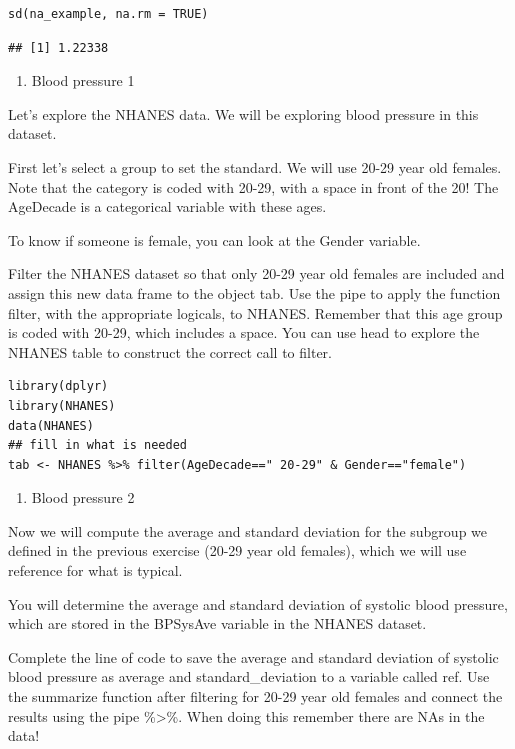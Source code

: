 \documentclass[
]{article}
\providecommand{\tightlist}{%
  \setlength{\itemsep}{0pt}\setlength{\parskip}{0pt}}
\begin{document}
\begin{verbatim}
sd(na_example, na.rm = TRUE)
\end{verbatim}

\begin{verbatim}
## [1] 1.22338
\end{verbatim}

\begin{enumerate}
\def\labelenumi{\arabic{enumi}.}
\tightlist
\item
  Blood pressure 1
\end{enumerate}

Let's explore the NHANES data. We will be exploring blood pressure in
this dataset.

First let's select a group to set the standard. We will use 20-29 year
old females. Note that the category is coded with 20-29, with a space in
front of the 20! The AgeDecade is a categorical variable with these
ages.

To know if someone is female, you can look at the Gender variable.

Filter the NHANES dataset so that only 20-29 year old females are
included and assign this new data frame to the object tab. Use the pipe
to apply the function filter, with the appropriate logicals, to NHANES.
Remember that this age group is coded with 20-29, which includes a
space. You can use head to explore the NHANES table to construct the
correct call to filter.

\begin{verbatim}
library(dplyr)
library(NHANES)
data(NHANES)
## fill in what is needed
tab <- NHANES %>% filter(AgeDecade==" 20-29" & Gender=="female")
\end{verbatim}

\begin{enumerate}
\def\labelenumi{\arabic{enumi}.}
\setcounter{enumi}{1}
\tightlist
\item
  Blood pressure 2
\end{enumerate}

Now we will compute the average and standard deviation for the subgroup
we defined in the previous exercise (20-29 year old females), which we
will use reference for what is typical.

You will determine the average and standard deviation of systolic blood
pressure, which are stored in the BPSysAve variable in the NHANES
dataset.

Complete the line of code to save the average and standard deviation of
systolic blood pressure as average and standard\_deviation to a variable
called ref. Use the summarize function after filtering for 20-29 year
old females and connect the results using the pipe \%\textgreater\%.
When doing this remember there are NAs in the data!
\end{document}
